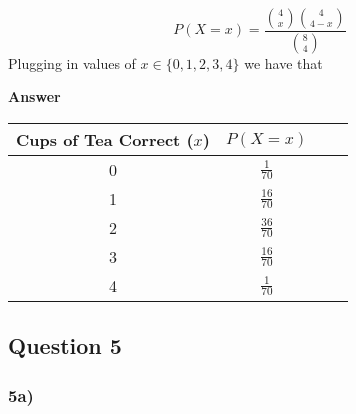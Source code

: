 \documentclass[
  11pt,
  letterpaper,
  DIV=11,
  numbers=noendperiod]{scrartcl}
\begin{document}
\[
P(X = x) =\frac{{4 \choose x}{4 \choose 4-x}}{{8 \choose 4}}
\] Plugging in values of \(x \in \{0, 1, 2, 3, 4\}\) we have that

\begin{tcolorbox}[enhanced jigsaw, arc=.35mm, colback=white, bottomrule=.15mm, breakable, opacityback=0, rightrule=.15mm, toprule=.15mm, leftrule=.75mm, left=2mm, colframe=quarto-callout-note-color-frame]

\textbf{Answer}\vspace{2mm}

\begin{table}[h]
\centering
\begin{tabular}{Sc|Sc}
Cups of Tea Correct ($x$) & $P(X = x)$ \\
 & $\frac{1}{70}$ \\
1 & $\frac{16}{70}$ \\
2 & $\frac{36}{70}$ \\
3 & $\frac{16}{70}$ \\
4 & $\frac{1}{70}$ 
\end{tabular}
\end{table}

\end{tcolorbox}

\hypertarget{question-5}{%
\subsection{Question 5}\label{question-5}}

\hypertarget{a-1}{%
\subsubsection{5a)}\label{a-1}}
\end{document}
